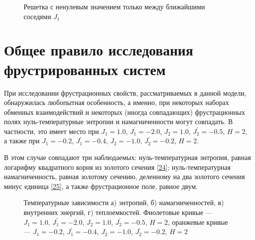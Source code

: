  \begin{figure}[h]
 	\caption{Решетка с ненулевым значением только между ближайшими соседями $J_1$}
 	\label{dimerChain}
 \end{figure}


\section{Общее правило исследования фрустрированных систем}

При исследовании фрустрационных свойств, рассматриваемых в данной модели, обнаружилась любопытная особенность, а именно, при некоторых наборах обменных взаимодействий и некоторых (иногда совпадающих) фрустрационных полях нуль-температурные энтропии и намагниченности могут совпадать. В частности, это имеет место при $J_1=1.0$, $J_1^{'}= -2.0$, $J_2=1.0$, $J_2^{'}= -0.5$, $H=2$, а также при  $J_1= -0.2$, $J_1^{'}= -0.4$, $J_2= -1.0$, $J_2^{'}= -0.2$, $H=2$. 

В этом случае совпадают три наблюдаемых: нуль-температурная энтропия, равная логарифму квадратного корня из золотого сечения \eqref{24}; нуль-температурная намагниченность, равная  золотому сечению, деленному на два золотого сечения минус единица  \eqref{25}, а также фрустрационное поле, равное двум.

 \begin{figure}[h]
	\begin{minipage}{0.47\linewidth}
	\end{minipage}
	\hfill
	\begin{minipage}{0.47\linewidth}
	\end{minipage}
	\vfill
	\begin{minipage}{0.47\linewidth}
	\end{minipage}
	\hfill
	\begin{minipage}{0.47\linewidth}
	\end{minipage}
	\caption{Температурные зависимости а) энтропий, б) намагниченностей, в)  внутренних энергий, г) теплоемкостей. Фиолетовые кривые --- $J_1=1.0$, $J_1^{'}= -2.0$, $J_2=1.0$, $J_2^{'}= -0.5$, $H=2$, оранжевые кривые --- $J_1= -0.2$, $J_1^{'}= -0.4$, $J_2= -1.0$, $J_2^{'}= -0.2$, $H=2$}
	\label{research}
\end{figure}

